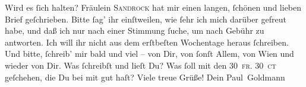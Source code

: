 \begin{ledgroupsized}[t]{13cm}
               Wird es ſich halten?\pend
           \pstart
           Fräulein \textsc{Sandrock} hat mir einen langen, ſchönen und lieben Brief geſchrieben. Bitte ſag’ ihr
               einſtweilen, wie ſehr ich mich darüber gefreut habe, und daß ich nur nach einer
               Stimmung ſuche, um nach Gebühr zu antworten. Ich will ihr nicht aus dem erſtbeſten
               Wochentage heraus ſchreiben.\pend
           \pstart
           Und bitte, ſchreib’ mir bald und viel – von Dir, von ſonſt Allem, von Wien und wieder von Dir. Was ſchreibſt und lieſt
               Du? Was ſoll mit den \textsc{30 fr. 30 ct} geſchehen, die Du bei mit
               gut haſt? Viele treue Grüße! Dein\pend
           \pstart \spacefill\mbox{Paul Goldmann}\pend{}
         
         \endnumbering{}\end{ledgroupsized}  \newcommand{\dateiname}{L02620}\newcommand{\titel}{Paul Goldmann an Arthur Schnitzler, 18. 11. 1894}\newcommand{\editorInnen}{Martin Anton Müller und Laura Untner}
      